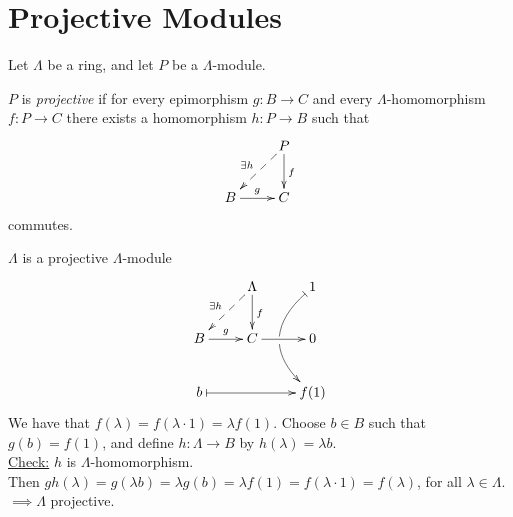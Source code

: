 \section{Projective Modules}
Let $\Lambda$ be a ring, and let $P$ be a $\Lambda$-module. 
\begin{defin}
$P$ is \emph{projective} if for every epimorphism $g\colon  B \to C$ and every  $\Lambda$-homomorphism $f\colon  P \to C$ there exists a homomorphism $h\colon  P \to B$ such that
$$\xymatrix{
& P\ar[d]^f \ar@{-->}[ld]_{\exists h}\\
B \ar[r]^g & C
}$$ commutes.
\end{defin}

\begin{exam}
$\Lambda$ is a projective $\Lambda$-module
$$\xymatrix{
& \Lambda\ar[d]^f \ar@{-->}[ld]_{\exists h} & 1\ar@/_2pc/@{|->}[dd]|\hole\\
B \ar[r]^g & C \ar[r] & 0\\
b\ar@{|->}[rr] && f(1)
}$$
We have that $f(\lambda) = f(\lambda \cdot 1) = \lambda f(1)$. Choose
$b \in B$ such that $g(b) = f(1)$, and define $h\colon  \Lambda \to B$ by  $h(\lambda) = \lambda b$.\\
\underline{Check:} $h$ is $\Lambda$-homomorphism.\\
Then $gh(\lambda) = g(\lambda b) = \lambda g(b) = \lambda f(1) =
f(\lambda \cdot 1) = f(\lambda)$, for all $\lambda \in \Lambda$.\\
$\implies \Lambda$ projective.
\end{exam}

